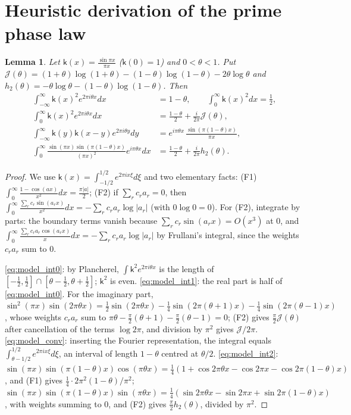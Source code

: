 \documentclass[11pt,reqno]{amsart}
\numberwithin{equation}{section}
\theoremstyle{plain}
\newtheorem{lemma}[theorem]{Lemma}
\theoremstyle{definition}
\theoremstyle{remark}
\newcommand{\sk}{\mathsf k}
\begin{document}
\appendix

\section{Heuristic derivation of the prime phase law}
\label{sec:appendix_model}

\begin{lemma}\label{lem:model_integrals}
Let $\sk(x)=\frac{\sin\pi x}{\pi x}$ ($\sk(0)=1$) and $0<\theta<1$. Put $\mathcal J(\theta)=(1+\theta)\log(1+\theta)-(1-\theta)\log(1-\theta)-2\theta\log\theta$ and $h_2(\theta)=-\theta\log\theta-(1-\theta)\log(1-\theta)$. Then
\begin{align}
\int_{-\infty}^{\infty}\sk(x)^2e^{2\pi i\theta x}dx&=1-\theta,\qquad\int_0^\infty\sk(x)^2dx=\frac12,
\label{eq:model_int0}\\
\int_0^\infty\sk(x)^2e^{2\pi i\theta x}dx&=\frac{1-\theta}2+\frac i{2\pi}\mathcal J(\theta),
\label{eq:model_int1}\\
\int_{-\infty}^\infty\sk(y)\sk(x-y)e^{2\pi i\theta y}dy&=e^{i\pi\theta x}\,\frac{\sin(\pi(1-\theta)x)}{\pi x},
\label{eq:model_conv}\\
\int_0^\infty\frac{\sin(\pi x)\sin(\pi(1-\theta)x)}{(\pi x)^2}e^{i\pi\theta x}dx&=\frac{1-\theta}2+\frac i{2\pi}h_2(\theta).
\label{eq:model_int2}
\end{align}
\end{lemma}

\begin{proof}
We use $\sk(x)=\int_{-1/2}^{1/2}e^{2\pi ix\xi}d\xi$ and two elementary facts: (F1) $\int_0^\infty\frac{1-\cos(ax)}{x^2}dx=\frac{\pi|a|}2$; (F2) if $\sum_rc_ra_r=0$, then $\int_0^\infty\frac{\sum_rc_r\sin(a_rx)}{x^2}dx=-\sum_rc_ra_r\log|a_r|$ (with $0\log0=0$). For (F2), integrate by parts: the boundary terms vanish because $\sum_rc_r\sin(a_rx)=O(x^3)$ at $0$, and $\int_0^\infty\frac{\sum_rc_ra_r\cos(a_rx)}xdx=-\sum_rc_ra_r\log|a_r|$ by Frullani's integral, since the weights $c_ra_r$ sum to $0$.

\eqref{eq:model_int0}: by Plancherel, $\int\sk^2e^{2\pi i\theta x}$ is the length of $[-\frac12,\frac12]\cap[\theta-\frac12,\theta+\frac12]$; $\sk^2$ is even. \eqref{eq:model_int1}: the real part is half of \eqref{eq:model_int0}. For the imaginary part, $\sin^2(\pi x)\sin(2\pi\theta x)=\frac12\sin(2\pi\theta x)-\frac14\sin(2\pi(\theta+1)x)-\frac14\sin(2\pi(\theta-1)x)$, whose weights $c_ra_r$ sum to $\pi\theta-\frac\pi2(\theta+1)-\frac\pi2(\theta-1)=0$; (F2) gives $\frac\pi2\mathcal J(\theta)$ after cancellation of the terms $\log2\pi$, and division by $\pi^2$ gives $\mathcal J/2\pi$. \eqref{eq:model_conv}: inserting the Fourier representation, the integral equals $\int_{\theta-1/2}^{1/2}e^{2\pi ix\xi}d\xi$, an interval of length $1-\theta$ centred at $\theta/2$. \eqref{eq:model_int2}: $\sin(\pi x)\sin(\pi(1-\theta)x)\cos(\pi\theta x)=\frac14(1+\cos2\pi\theta x-\cos2\pi x-\cos2\pi(1-\theta)x)$, and (F1) gives $\frac14\cdot2\pi^2(1-\theta)/\pi^2$; $\sin(\pi x)\sin(\pi(1-\theta)x)\sin(\pi\theta x)=\frac14(\sin2\pi\theta x-\sin2\pi x+\sin2\pi(1-\theta)x)$, with weights summing to $0$, and (F2) gives $\frac\pi2h_2(\theta)$, divided by $\pi^2$.
\end{proof}
\end{document}
